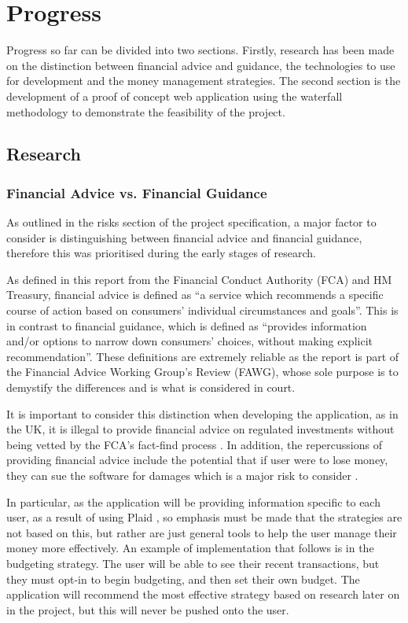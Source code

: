 \section{Progress} \label{sec:progress}

Progress so far can be divided into two sections. Firstly, research has been made on the distinction between financial advice and guidance, the technologies to use for development and the money management strategies. The second section is the development of a proof of concept web application using the waterfall methodology to demonstrate the feasibility of the project.

\subsection{Research}
\subsubsection{Financial Advice vs. Financial Guidance}
As outlined in the risks section of the project specification, a major factor to consider is distinguishing between financial advice and financial guidance, therefore this was prioritised during the early stages of research.

As defined in this report \cite{FCAReport} from the Financial Conduct Authority (FCA) and HM Treasury, financial advice is defined as ``a service which recommends a specific course of action based on consumers' individual circumstances and goals''. This is in contrast to financial guidance, which is defined as ``provides information and/or options to narrow down consumers' choices, without making explicit recommendation''. These definitions are extremely reliable as the report is part of the Financial Advice Working Group's Review (FAWG), whose sole purpose is to demystify the differences and is what is considered in court.

It is important to consider this distinction when developing the application, as in the UK, it is illegal to provide financial advice on regulated investments without being vetted by the FCA's fact-find process \cite{FinancialAdviceLegalities}. In addition, the repercussions of providing financial advice include the potential that if user were to lose money, they can sue the software for damages which is a major risk to consider \cite{SueBroker}. 

In particular, as the application will be providing information specific to each user, as a result of using Plaid \cite{Plaid}, so emphasis must be made that the strategies are not based on this, but rather are just general tools to help the user manage their money more effectively. An example of implementation that follows is in the budgeting strategy. The user will be able to see their recent transactions, but they must opt-in to begin budgeting, and then set their own budget. The application will recommend the most effective strategy based on research later on in the project, but this will never be pushed onto the user.


